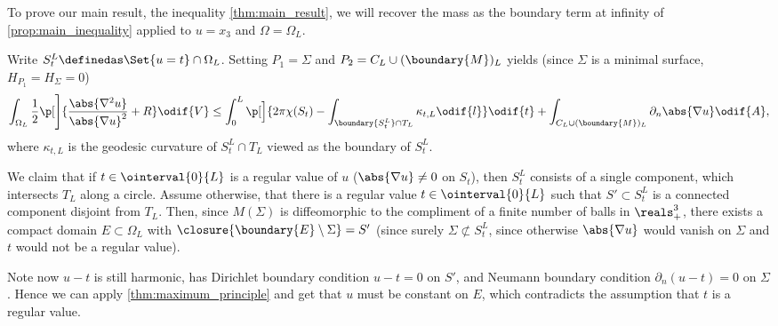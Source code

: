 \documentclass[titlepage,numbers=noenddot,headinclude,oneside,%
footinclude=true,cleardoublepage=empty,%
BCOR=5mm,paper=a4,fontsize=11pt,%
english,%
]{scrartcl}
\begin{document}
\newcommand{\nonzeroboundary}{\partial_{\neq 0}M^L}\newcommand{\maxu}{\bar{u}}
\newcommand{\minu}{\underline{u}}
To prove our main result, the inequality \cref{thm:main_result}, we will recover the mass as the boundary term at infinity of \cref{prop:main_inequality} applied to \( u=x_3 \) and \( \Omega=\Omega_L \).


Write \( S_t^L\definedas \Set{u=t}\cap \Omega_L \). Setting \( P_1=\Sigma\) and \( P_2=C_L\cup (\boundary{M})_L \) yields (since \( \Sigma \) is a minimal surface, \ie \( H_{P_1}=H_\Sigma=0 \))
\begin{equation}
    \int_{\Omega_L} \frac{1}{2}\p[\Bigg]{\frac{\abs{\nabla^2 u}}{\abs{\nabla u}^2}+R }\odif{V} \leq\int_{0}^{L}\p[\Big]{2\pi \chi(S_t)-\int _{\boundary{S_t^L} \cap T_L}\kappa_{t,L}\odif{l}}\odif{t}+ \int_{C_L\cup (\boundary{M})_L}\partial_{n} \abs{\nabla u}\odif{A},\label{eq:just_insert_cylinder_into_main_inequality}
\end{equation}
where \( \kappa_{t,L} \) is the geodesic curvature of \( S_{t}^L \cap T_L\) viewed as the boundary of \( S_t^L \).

We claim that if \( t\in \ointerval{0}{L} \) is a regular value of \( u \) (\ie \( \abs{\nabla u}\neq 0 \) on \( S_t \)), then \( S_t^L \) consists of a single component, which intersects \( T_L \) along a circle. Assume otherwise, \ie that there is a regular value \( t\in \ointerval{0}{L} \) such that \( S'\subset S_t^L \) is a connected component disjoint from \( T_L \). Then, since \( M(\Sigma) \) is diffeomorphic to the compliment of a finite number of balls in \( \reals^3_+ \), there exists a compact domain \( E\subset \Omega_L \) with \( \closure{\boundary{E}\setminus \Sigma}=S' \) (since surely \( \Sigma\not\subset S_t^L \), since otherwise \( \abs{\nabla u} \) would vanish on \( \Sigma \) and \( t \) would not be a regular value).

Note now \( u-t \) is still harmonic, has Dirichlet boundary condition \( u-t=0 \) on \( S' \), and Neumann boundary condition \( \partial_n (u-t)=0 \) on \( \Sigma \). Hence we can apply \cref{thm:maximum_principle} and get that \( u \) must be constant on \( E \), which contradicts the assumption that \( t \) is a regular value.
\end{document}
